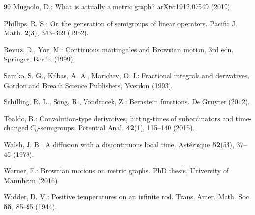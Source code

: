 \documentclass[11pt,a4paper]{article}
\theoremstyle{plain}
\theoremstyle{definition}
\theoremstyle{remark}
\begin{document}
\begin{thebibliography}{99}
			Mugnolo, D.:
			What is actually a metric graph? arXiv:1912.07549 (2019).
			
			Phillips, R. S.:
			On the generation of semigroups of linear operators. Pacific J. Math. \textbf{2}(3), 343--369 (1952).
			
			Revuz, D., Yor, M.:
			Continuous martingales and Brownian motion, 3rd edn. Springer, Berlin (1999).
			
			Samko, S. G., Kilbas, A. A., Marichev, O. I.:
			Fractional integrals and derivatives. Gordon and Breach Science Publishers, Yverdon (1993).
			
			Schilling, R. L., Song, R., Vondracek, Z.:
			Bernstein functions. De Gruyter (2012).
			
			Toaldo, B.:
			Convolution-type derivatives, hitting-times of subordinators and time-changed $C_0$-semigroups. Potential Anal. 	\textbf{42}(1), 115--140 (2015).
			
			Walsh, J. B.:
			A diffusion with a discontinuous local time. Ast\'erisque \textbf{52}(53), 37--45 (1978).
			
			Werner, F.:
			Brownian motions on metric graphs. PhD thesis, University of Mannheim (2016).
			
			Widder, D. V.:
			Positive temperatures on an infinite rod. Trans. Amer. Math. Soc. \textbf{55}, 85--95 (1944).
			
		\end{thebibliography}
\end{document}
